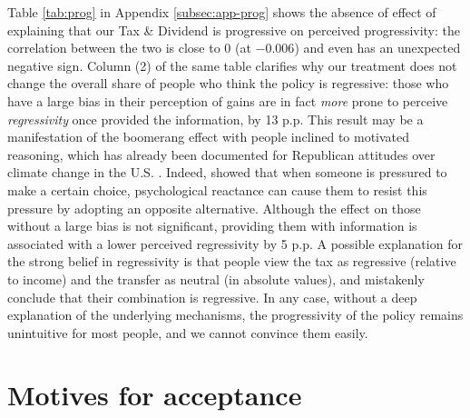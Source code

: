 \documentclass[11pt]{article}
\begin{document}
Table \ref{tab:prog} in Appendix \ref{subsec:app-prog} shows the absence of effect of explaining that our Tax \& Dividend is progressive on perceived progressivity: the correlation between the two is close to 0 (at $-0.006$) and even has an unexpected negative sign. Column (2) of the same table clarifies why our treatment does not change the overall share of people who think the policy is regressive: those who have a large bias in their perception of gains are in fact \textit{more} prone to perceive \textit{regressivity} once provided the information, by 13 p.p. This result may be a manifestation of the boomerang effect with people inclined to motivated reasoning, which has already been documented for Republican attitudes over climate change in the U.S. \citep{zhou_boomerangs_2016}. Indeed, \citet{hovland_communication_1953} showed that when someone is pressured to make a certain choice, psychological reactance \citep[theorized by][]{brehm_theory_1966} can cause them to resist this pressure by adopting an opposite alternative.  Although the effect on those without a large bias is not significant, providing them with information is associated with a lower perceived regressivity by 5 p.p. A possible explanation for the strong belief in regressivity is that people view the tax as regressive (relative to income) and the transfer as neutral (in absolute values), and mistakenly conclude that their combination is regressive. In any case, without a deep explanation of the underlying mechanisms, the progressivity of the policy remains unintuitive for most people, and we cannot convince them easily.





\section{Motives for acceptance \label{sec:motives5}}
\end{document}
